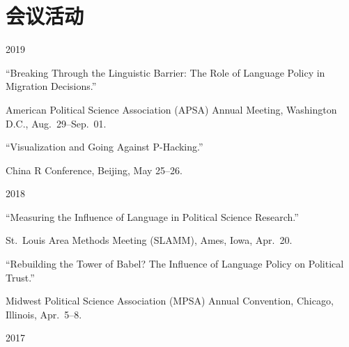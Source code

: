 \documentclass[10.5pt,]{article}
\providecommand{\tightlist}{%
	\setlength{\itemsep}{0pt}\setlength{\parskip}{0pt}}
\renewenvironment{itemize}{
	\begin{list}{}{
			\setlength{\leftmargin}{1.5em}
		}
	}{
	\end{list}
}
\begin{document}
 \hypertarget{ux4f1aux8baeux6d3bux52a8}{%
 \section{会议活动}\label{ux4f1aux8baeux6d3bux52a8}}

 \begin{itemize}
 \tightlist
 \item
   2019

   \begin{itemize}
   \tightlist
   \item
     ``Breaking Through the Linguistic Barrier: The Role of Language
     Policy in Migration Decisions.''

     \begin{itemize}
     \tightlist
     \item
       \footnotesize American Political Science Association (APSA)
       Annual Meeting, Washington D.C., Aug.~29--Sep.~01.
     \end{itemize}
   \item
     ``Visualization and Going Against P-Hacking.''

     \begin{itemize}
     \tightlist
     \item
       \footnotesize China R Conference, Beijing, May 25--26.
     \end{itemize}
   \end{itemize}
 \item
   2018

   \begin{itemize}
   \tightlist
   \item
     ``Measuring the Influence of Language in Political Science
     Research.''

     \begin{itemize}
     \tightlist
     \item
       \footnotesize St.~Louis Area Methods Meeting (SLAMM), Ames, Iowa,
       Apr.~20.
     \end{itemize}
   \item
     ``Rebuilding the Tower of Babel? The Influence of Language Policy
     on Political Trust.''

     \begin{itemize}
     \tightlist
     \item
       \footnotesize Midwest Political Science Association (MPSA) Annual
       Convention, Chicago, Illinois, Apr.~5--8.
     \end{itemize}
   \end{itemize}
 \item
   2017


\end{itemize}
\end{document}
